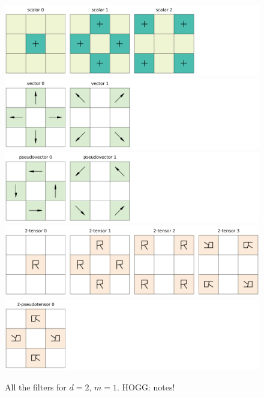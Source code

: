 \documentclass{article}
\theoremstyle{plain}
\begin{document}
\begin{figure}[tp]
  \begin{mdframed}
  \color{captiongray}
  \begin{center}
\includegraphics[width=\textwidth]{notebooks/filter+0_2_3.png}\\
\includegraphics[width=\textwidth]{notebooks/filter+1_2_3.png}\\
\includegraphics[width=\textwidth]{notebooks/filter-1_2_3.png}
\includegraphics[width=\textwidth]{notebooks/filter+2_2_3.png}\\
\includegraphics[width=\textwidth]{notebooks/filter-2_2_3.png}
  \end{center}
\caption{All the filters for $d=2$, $m=1$. HOGG: notes!}
  \end{mdframed}
\end{figure}
\end{document}
